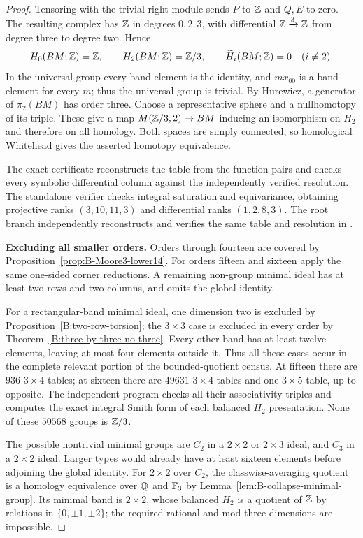 \begin{proof}
Tensoring with the trivial right module sends $P$ to $\mathbb Z$ and
$Q,E$ to zero. The resulting complex has $\mathbb Z$ in degrees
$0,2,3$, with differential $\mathbb Z\xrightarrow{3}\mathbb Z$ from degree
three to degree two. Hence
\[
 H_0(BM;\mathbb Z)=\mathbb Z,\qquad H_2(BM;\mathbb Z)=\mathbb Z/3,
 \qquad \widetilde H_i(BM;\mathbb Z)=0\quad(i\ne2).
\]
In the universal group every band element is the identity, and
$m x_{00}$ is a band element for every $m$; thus the universal
group is trivial. By Hurewicz, a generator of $\pi_2(BM)$ has
order three. Choose a representative sphere and a nullhomotopy
of its triple. These give a map $M(\mathbb Z/3,2)\to BM$ inducing an
isomorphism on $H_2$ and therefore on all homology. Both spaces
are simply connected, so homological Whitehead gives the asserted
homotopy equivalence.

The exact certificate
 reconstructs the table from
the function pairs and checks every symbolic differential column
against the independently verified resolution. The standalone
verifier checks integral saturation and equivariance, obtaining
projective ranks $(3,10,11,3)$ and differential ranks $(1,2,8,3)$.
The root branch independently reconstructs and verifies the same
table and resolution in .

\textbf{Excluding all smaller orders.}
Orders through fourteen are covered by
Proposition~\ref{prop:B-Moore3-lower14}. For orders fifteen and
sixteen apply the same one-sided corner reductions. A remaining
non-group minimal ideal has at least two rows and two columns,
and omits the global identity.

For a rectangular-band minimal ideal, one dimension two is
excluded by Proposition~\ref{B:two-row-torsion}; the $3\times3$
case is excluded in every order by
Theorem~\ref{B:three-by-three-no-three}. Every other band has
at least twelve elements, leaving at most four elements outside
it. Thus all these cases occur in the complete relevant portion
of the bounded-quotient census. At fifteen there are $936$
$3\times4$ tables; at sixteen there are $49631$ $3\times4$
tables and one $3\times5$ table, up to opposite. The independent
program  checks
all their associativity triples and computes the exact integral
Smith form of each balanced $H_2$ presentation. None of these
$50568$ groups is $\mathbb Z/3$.

The possible nontrivial minimal groups are $C_2$ in a
$2\times2$ or $2\times3$ ideal, and $C_3$ in a $2\times2$
ideal. Larger types would already have at least sixteen elements
before adjoining the global identity. For $2\times2$ over $C_2$,
the classwise-averaging quotient is a homology equivalence over
$\mathbb Q$ and $\mathbb F_3$ by
Lemma~\ref{lem:B-collapse-minimal-group}. Its minimal band is
$2\times2$, whose balanced $H_2$ is a quotient of $\mathbb Z$ by
relations in $\{0,\pm1,\pm2\}$; the required rational and
mod-three dimensions are impossible.


\end{proof}
